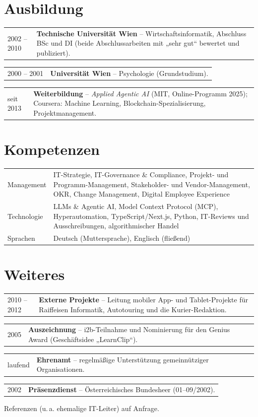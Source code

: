 \documentclass[10.5pt]{article}
\makeatletter
\newcommand{\kurz}[2]{%
  \begin{tabularx}{\textwidth}{@{}p{24mm}X@{}}{\leavevmode\small\color{muted}#1} & #2\end{tabularx}\par\vspace{3pt}}
\makeatother
\begin{document}
\section{Ausbildung}
\kurz{2002 -- 2010}{\textbf{Technische Universität Wien} -- Wirtschaftsinformatik, Abschluss BSc und DI (beide Abschlussarbeiten mit „sehr gut“ bewertet und publiziert).}
\kurz{2000 -- 2001}{\textbf{Universität Wien} -- Psychologie (Grundstudium).}
\kurz{seit 2013}{\textbf{Weiterbildung} -- \emph{Applied Agentic AI} (MIT, Online-Programm 2025); Coursera: Machine Learning, Blockchain-Spezialisierung, Projektmanagement.}

\section{Kompetenzen}
\begin{tabularx}{\textwidth}{@{}p{24mm}X@{}}
  {\leavevmode\small\color{muted}Management} & IT-Strategie, IT-Governance \& Compliance, Projekt- und Programm-Management, Stakeholder- und Vendor-Management, OKR, Change Management, Digital Employee Experience\\[3pt]
  {\leavevmode\small\color{muted}Technologie} & LLMs \& Agentic AI, Model Context Protocol (MCP), Hyperautomation, TypeScript/Next.js, Python, IT-Reviews und Ausschreibungen, algorithmischer Handel\\[3pt]
  {\leavevmode\small\color{muted}Sprachen} & Deutsch (Muttersprache), Englisch (fließend)\\
\end{tabularx}

\section{Weiteres}
\kurz{2010 -- 2012}{\textbf{Externe Projekte} -- Leitung mobiler App- und Tablet-Projekte für Raiffeisen Informatik, Autotouring und die Kurier-Redaktion.}
\kurz{2005}{\textbf{Auszeichnung} -- i2b-Teilnahme und Nominierung für den Genius Award (Geschäftsidee „LearnClip“).}
\kurz{laufend}{\textbf{Ehrenamt} -- regelmäßige Unterstützung gemeinnütziger Organisationen.}
\kurz{2002}{\textbf{Präsenzdienst} -- Österreichisches Bundesheer (01--09/2002).}

\vspace{4pt}
{\small\color{muted}Referenzen (u.\,a. ehemalige IT-Leiter) auf Anfrage.\par}
\end{document}

